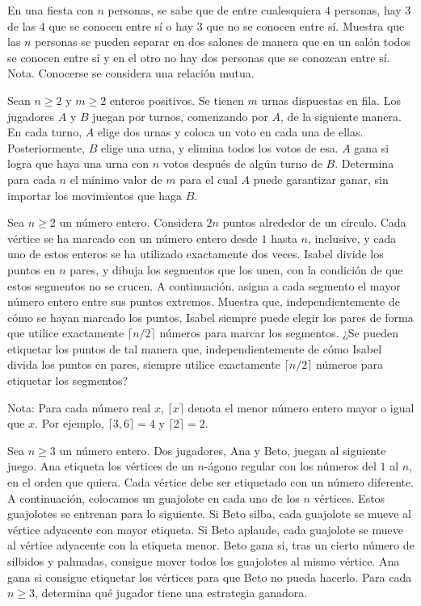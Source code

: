\documentclass[11pt]{scrartcl}
\begin{document}
\begin{problem}
    [2009/6]
    En una fiesta con $n$ personas, se sabe que de entre cualesquiera $4$ personas, hay $3$ de las
$4$ que se conocen entre sí o hay $3$ que no se conocen entre sí. Muestra que las $n$ personas
se pueden separar en dos salones de manera que en un salón todos se conocen entre sí y
en el otro no hay dos personas que se conozcan entre sí.
Nota. Conocerse se considera una relación mutua.
\end{problem}
\begin{problem}
    [2017/6] 
    Sean $n \geq 2$ y $m \geq 2$ enteros positivos. Se tienen $m$ urnas dispuestas en fila. Los jugadores
$A$ y $B$ juegan por turnos, comenzando por $A$, de la siguiente manera. En cada turno, $A$
elige dos urnas y coloca un voto en cada una de ellas. Posteriormente, $B$ elige una urna,
y elimina todos los votos de esa. $A$ gana si logra que haya una urna con $n$ votos después
de algún turno de $B$. Determina para cada $n$ el mínimo valor de $m$ para el cual $A$ puede
garantizar ganar, sin importar los movimientos que haga $B$.
\end{problem}
\begin{problem}
    [2019/3] 
    Sea $n\geq 2$ un número entero. Considera $2n$ puntos alrededor de un círculo. Cada vértice se ha marcado con un número entero desde $1$ hasta $n$, inclusive, y cada uno de estos enteros se ha utilizado exactamente dos veces. Isabel divide los puntos en $n$ pares, y dibuja los segmentos que los unen, con la condición de que estos segmentos no se crucen. A continuación, asigna a cada segmento el mayor número entero entre sus puntos extremos. Muestra que, independientemente de cómo se hayan marcado los puntos, Isabel siempre puede elegir los pares de forma que utilice exactamente $\lceil n/2\rceil$ números para marcar los segmentos. ¿Se pueden etiquetar los puntos de tal manera que, independientemente de cómo Isabel divida los puntos en pares, siempre utilice exactamente $\lceil n/2\rceil$ números para etiquetar los segmentos?

Nota: Para cada número real $x$, $\lceil x\rceil$ denota el menor número entero mayor o igual que $x$. Por ejemplo, $\lceil 3,6\rceil=4$ y $\lceil 2\rceil=2$.
\end{problem}
\begin{problem}
    [2020/3] 
    Sea $n\ge 3$ un número entero. Dos jugadores, Ana y Beto, juegan al siguiente juego. Ana etiqueta los vértices de un $n$-ágono regular con los números del $1$ al $n$, en el orden que quiera. Cada vértice debe ser etiquetado con un número diferente. A continuación, colocamos un guajolote en cada uno de los $n$ vértices.  \newline 
Estos guajolotes se entrenan para lo siguiente. Si Beto silba, cada guajolote se mueve al vértice adyacente con mayor etiqueta. Si Beto aplaude, cada guajolote se mueve al vértice adyacente con la etiqueta menor.  \newline 
Beto gana si, tras un cierto número de silbidos y palmadas, consigue mover todos los guajolotes al mismo vértice. Ana gana si consigue etiquetar los vértices para que Beto no pueda hacerlo. Para cada $n\ge 3$, determina qué jugador tiene una estrategia ganadora.
\end{problem}
\end{document}
